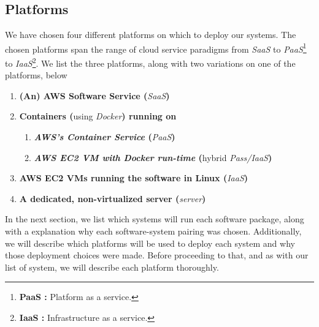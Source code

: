 \documentclass{article}[12pt]
\numberwithin{equation}{section}
\begin{document}
\begin{flushleft}


\subsection{Platforms}
\begin{spacing}{1.5}
	We have chosen four different platforms on which to deploy our systems.  The chosen platforms span the range of cloud service paradigms from \emph{SaaS} to \emph{PaaS}\footnote{\textbf{PaaS :} Platform as a service.} to \emph{IaaS}\footnote{\textbf{IaaS :} Infrastructure as a service.}.  We list the three platforms, along with two variations on one of the platforms, below
	
	
	\begin{enumerate}[label=\large{\textbf{\arabic*}):}]
		\item \textbf{(An) AWS Software Service (}\emph{SaaS}\textbf{)}
		\item \textbf{Containers (}using \emph{Docker}\textbf{) running on}
		
		\begin{enumerate}[label=\large{\textbf{\roman*}):}]
			\item \textbf{\emph{AWS's Container Service} (}\emph{PaaS}\textbf{)}
			\item \textbf{\emph{AWS EC2 VM with Docker run-time} (}hybrid \emph{Pass/IaaS}\textbf{)}
		\end{enumerate}
		\vspace{0.025in}
		
		\item \textbf{AWS EC2 VMs running the software in Linux (}\emph{IaaS}\textbf{)}
		\item \textbf{A dedicated, non-virtualized server (}\emph{server}\textbf{)}
	\end{enumerate}
	
	
	In the next section, we list which systems will run each software package, along with a explanation why each software-system pairing was chosen.  Additionally, we will describe which platforms will be used to deploy each system and why those deployment choices were made.  Before proceeding to that, and as with our list of system, we will describe each platform thoroughly.
\end{spacing}



\end{flushleft}
\end{document}
